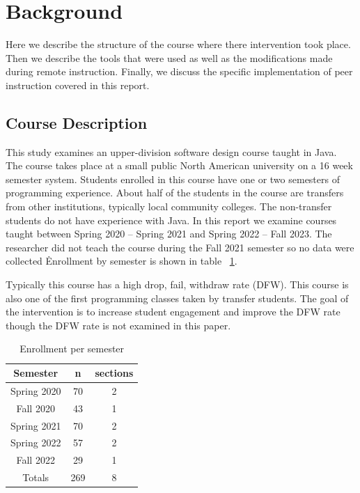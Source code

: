 \documentclass[12pt]{article}
\newcommand\sampleSize{163}
\newcommand\classSize{269}
\begin{document}
\section{Background}

Here we describe the structure of the course where there intervention took place. Then we describe the tools that were used as well as the modifications made during remote instruction. Finally, we discuss the specific implementation of peer instruction covered in this report.

\subsection{Course Description}
This study examines an upper-division software design course taught in Java. The course takes place at a small public North American university on a 16 week semester system. Students enrolled in this course have one or two semesters of programming experience. About half of the students in the course are transfers from other institutions, typically local community colleges. The non-transfer students do not have experience with Java. 
In this report we examine courses taught between Spring 2020 – Spring 2021 and Spring 2022 – Fall 2023.  The researcher did not teach the course during the Fall 2021 semester so no data were collected \. Enrollment by semester is shown in table ~\ref{table:enrollmentBySemester}.

Typically this course has a high drop, fail, withdraw rate (DFW).  This course is also one of the first programming classes taken by transfer students.  The goal of the intervention is to increase student engagement and improve the DFW rate though the DFW rate is not examined in this paper.  


\begin{table}[ht]
\centering
\caption{Enrollment per semester}
\begin{tabular}{|c|c|c|}
\toprule
Semester    & n  & sections\\ \midrule
\rowcolor{LightGray}
Spring 2020 & 70 & 2 \\ \midrule
Fall 2020   & 43 & 1 \\ \midrule
\rowcolor{LightGray}
Spring 2021 & 70 & 2 \\ \midrule
Spring 2022 & 57 & 2 \\ \midrule
\rowcolor{LightGray}
Fall 2022 & 29 & 1 \\ \midrule
Totals & \classSize & 8 \\ \bottomrule
\end{tabular}
\label{table:enrollmentBySemester}
\end{table}
\end{document}
